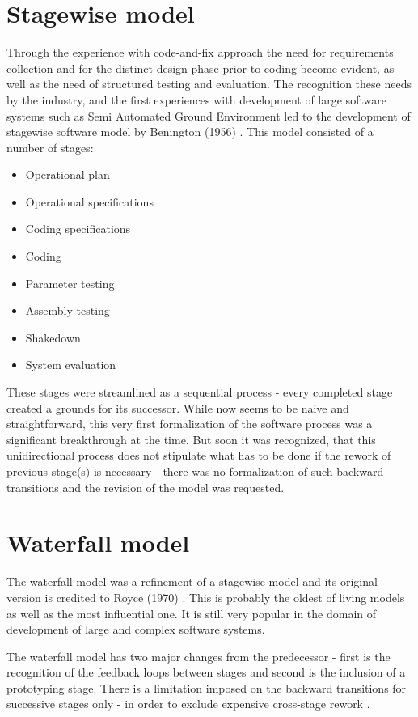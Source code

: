 \section{Stagewise model}
Through the experience with code-and-fix approach the need for requirements collection and 
for the distinct design phase prior to coding become evident, as well as the need of structured 
testing and evaluation. The recognition these needs by the industry, and the first experiences
with development of large software systems such as Semi Automated Ground 
Environment \cite{citeulike:10004001} \cite{citeulike:10004037} led to the development 
of stagewise software model by Benington (1956) \cite{citeulike:10004032}. 
This model consisted of a number of stages:
\begin{itemize}
 \item Operational plan
 \item Operational specifications
 \item Coding specifications
 \item Coding
 \item Parameter testing
 \item Assembly testing
 \item Shakedown
 \item System evaluation
\end{itemize}
These stages were streamlined as a sequential process - every completed stage created a
grounds for its successor. While now seems to be naive and straightforward, this very 
first formalization of the software process was a significant breakthrough at the time. 
But soon it was recognized, that this unidirectional process does not stipulate what 
has to be done if the rework of previous stage(s) is necessary - there was 
no formalization of such backward transitions and the revision of the model was requested.

\section{Waterfall model}
The waterfall model was a refinement of a stagewise model and its original version is 
credited to Royce (1970) \cite{citeulike:9982731}. This is probably the oldest of living
models as well as the most influential one. It is still very popular in the domain of 
development of large and complex software systems. 

The waterfall model has two major changes from the predecessor - first is the recognition 
of the feedback loops between stages and second is the inclusion of a prototyping stage. 
There is a limitation imposed on the backward transitions for successive stages only - 
in order to exclude expensive cross-stage rework \cite{Boehm95anchoringthe}.

